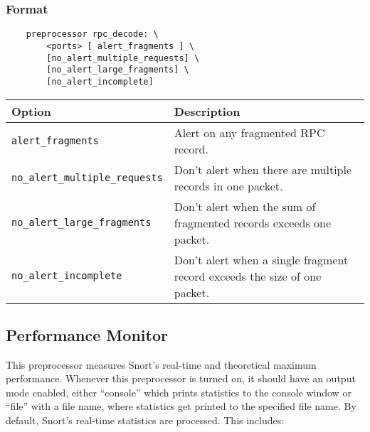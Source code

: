 \documentclass[english]{report}
\begin{document}
\subsubsection{Format}

\begin{verbatim}
    preprocessor rpc_decode: \
        <ports> [ alert_fragments ] \
        [no_alert_multiple_requests] \
        [no_alert_large_fragments] \
        [no_alert_incomplete]
\end{verbatim}

\begin{table}[h]
\begin{center}
\begin{tabular}{| l | l |}

\hline 
\textbf{Option}& \textbf{Description}\\
\hline

\hline 
\texttt{alert\_fragments}&

Alert on any fragmented RPC record.\\

\hline 
\texttt{no\_alert\_multiple\_requests}&

Don't alert when there are multiple records in one packet.\\

\hline 
\texttt{no\_alert\_large\_fragments}&

Don't alert when the sum of fragmented records exceeds one packet.\\

\hline 
\texttt{no\_alert\_incomplete}&

Don't alert when a single fragment record exceeds the size of one packet.\\

\hline
\end{tabular}
\end{center}
\end{table}

\subsection{Performance Monitor}
\label{sub:perfmonitor}

This preprocessor measures Snort's real-time and theoretical maximum
performance.  Whenever this preprocessor is turned on, it should have an output
mode enabled, either ``console'' which prints statistics to the console window
or ``file'' with a file name, where statistics get printed to the specified
file name. By default, Snort's real-time statistics are processed. This
includes:
\end{document}
